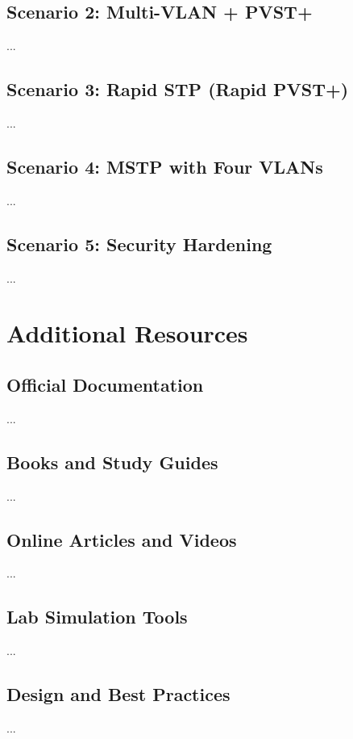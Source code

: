 \documentclass[a4paper]{report}
\begin{document}
\section{Scenario 2: Multi-VLAN + PVST+}
...

\section{Scenario 3: Rapid STP (Rapid PVST+)}
...

\section{Scenario 4: MSTP with Four VLANs}
...

\section{Scenario 5: Security Hardening}
...

\chapter{Additional Resources}
\section{Official Documentation}
...

\section{Books and Study Guides}
...

\section{Online Articles and Videos}
...

\section{Lab Simulation Tools}
...

\section{Design and Best Practices}
...

\end{document}
